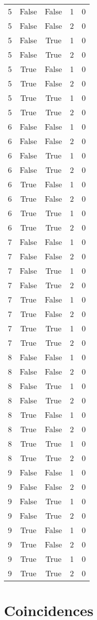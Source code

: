 \documentclass[12pt,reqno]{amsart}
\theoremstyle{plain}
\theoremstyle{definition}
\numberwithin{equation}{section}
\begin{document}
\begin{longtable}{ccccc}
5 & False & False & 1 & 0 \\ 
5 & False & False & 2 & 0 \\ 
5 & False & True & 1 & 0 \\ 
5 & False & True & 2 & 0 \\ 
5 & True & False & 1 & 0 \\ 
5 & True & False & 2 & 0 \\ 
5 & True & True & 1 & 0 \\ 
5 & True & True & 2 & 0 \\ 
6 & False & False & 1 & 0 \\ 
6 & False & False & 2 & 0 \\ 
6 & False & True & 1 & 0 \\ 
6 & False & True & 2 & 0 \\ 
6 & True & False & 1 & 0 \\ 
6 & True & False & 2 & 0 \\ 
6 & True & True & 1 & 0 \\ 
6 & True & True & 2 & 0 \\ 
7 & False & False & 1 & 0 \\ 
7 & False & False & 2 & 0 \\ 
7 & False & True & 1 & 0 \\ 
7 & False & True & 2 & 0 \\ 
7 & True & False & 1 & 0 \\ 
7 & True & False & 2 & 0 \\ 
7 & True & True & 1 & 0 \\ 
7 & True & True & 2 & 0 \\ 
8 & False & False & 1 & 0 \\ 
8 & False & False & 2 & 0 \\ 
8 & False & True & 1 & 0 \\ 
8 & False & True & 2 & 0 \\ 
8 & True & False & 1 & 0 \\ 
8 & True & False & 2 & 0 \\ 
8 & True & True & 1 & 0 \\ 
8 & True & True & 2 & 0 \\ 
9 & False & False & 1 & 0 \\ 
9 & False & False & 2 & 0 \\ 
9 & False & True & 1 & 0 \\ 
9 & False & True & 2 & 0 \\ 
9 & True & False & 1 & 0 \\ 
9 & True & False & 2 & 0 \\ 
9 & True & True & 1 & 0 \\ 
9 & True & True & 2 & 0 \\ 
\end{longtable}

\section{Coincidences}
\end{document}
